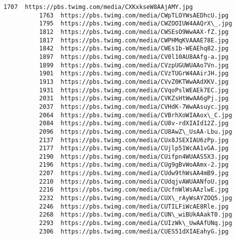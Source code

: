 \documentclass[11pt]{article}
\begin{document}
\begin{Verbatim}[commandchars=\\\{\}]
          1707  https://pbs.twimg.com/media/CXKxkseW8AAjAMY.jpg                                           
          1763  https://pbs.twimg.com/media/CWpTLOYWsAEDhcU.jpg                                           
          1795  https://pbs.twimg.com/media/CWZOOIUW4AAQrX\_.jpg                                           
          1812  https://pbs.twimg.com/media/CWSEsO9WwAAX-fZ.jpg                                           
          1817  https://pbs.twimg.com/media/CWPHMqKVAAAE78E.jpg                                           
          1842  https://pbs.twimg.com/media/CWEs1b-WEAEhq82.jpg                                           
          1897  https://pbs.twimg.com/media/CV0l10AU8AAfg-a.jpg                                           
          1899  https://pbs.twimg.com/media/CVzpUGUWUAAo7Vn.jpg                                           
          1901  https://pbs.twimg.com/media/CVzTUGrW4AAirJH.jpg                                           
          1913  https://pbs.twimg.com/media/CVvZ0KTWwAAdXKV.jpg                                           
          1931  https://pbs.twimg.com/media/CVqoPslWEAEk7EC.jpg                                           
          2031  https://pbs.twimg.com/media/CVKZsHtWwAA6gPj.jpg                                           
          2037  https://pbs.twimg.com/media/CVHdK-7WwAAsuyc.jpg                                           
          2064  https://pbs.twimg.com/media/CVBrhXoWIAAox\_C.jpg                                           
          2084  https://pbs.twimg.com/media/CU8v-rdXIAId12Z.jpg                                           
          2096  https://pbs.twimg.com/media/CU8AwZ\_UsAA-Lbu.jpg                                           
          2137  https://pbs.twimg.com/media/CUx8JSEXIAU6zPp.jpg                                           
          2177  https://pbs.twimg.com/media/CUjlp51WcAA1vGA.jpg                                           
          2190  https://pbs.twimg.com/media/CUifpn4WUAAS5X3.jpg                                           
          2196  https://pbs.twimg.com/media/CUg9gBvWoAAmx-2.jpg                                           
          2207  https://pbs.twimg.com/media/CUdw9thWsAA4mB9.jpg                                           
          2210  https://pbs.twimg.com/media/CUdqjvAWUAANfoU.jpg                                           
          2216  https://pbs.twimg.com/media/CUcfnWlWsAAzlwE.jpg                                           
          2232  https://pbs.twimg.com/media/CUX\_rAyWsAYZOQ5.jpg                                           
          2246  https://pbs.twimg.com/media/CUTILFiWcAE8Rle.jpg                                           
          2268  https://pbs.twimg.com/media/CUN\_wiBUkAAakT0.jpg                                           
          2293  https://pbs.twimg.com/media/CUIzWk\_UwAAfUNq.jpg                                           
          2306  https://pbs.twimg.com/media/CUES51dXIAEahyG.jpg                                           
          

\end{Verbatim}
\end{document}
